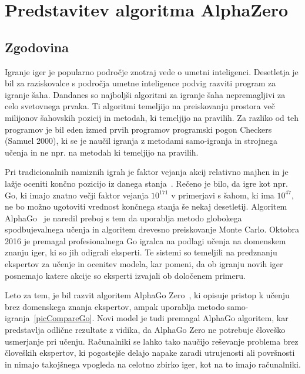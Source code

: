 \documentclass[a4paper, 12pt]{book}
\begin{document}

\chapter{Predstavitev algoritma AlphaZero}
\label{alphazero}
\section{Zgodovina}

Igranje iger je popularno področje znotraj vede o umetni inteligenci. 
Desetletja je bil za raziskovalce s področja umetne inteligence podvig razviti program za igranje šaha.
Dandanes so najboljši algoritmi za igranje šaha nepremagljivi za celo svetovnega prvaka.
Ti algoritmi temeljijo na preiskovanju prostora več milijonov šahovskih pozicij in metodah, ki temeljijo na pravilih.
Za razliko od teh programov je bil eden izmed prvih programov programski pogon Checkers (Samuel 2000), ki se je naučil igranja z metodami samo-igranja in strojnega učenja in ne npr. na metodah ki temeljijo na pravilih.

Pri tradicionalnih namiznih igrah je faktor vejanja akcij relativno majhen in je lažje oceniti končno pozicijo iz danega stanja~\cite{wiki:AlphaGo}.
Rečeno je bilo, da igre kot npr. Go, ki imajo znatno večji faktor vejanja $10^{171}$ v primerjavi s šahom, ki ima $10^{47}$, ne bo možno ugotoviti vrednost končnega stanja še nekaj desetletij.
Algoritem AlphaGo~\cite{silver2016mastering} je naredil preboj s tem da uporablja metodo globokega spodbujevalnega učenja in algoritem drevesno preiskovanje Monte Carlo. 
Oktobra 2016 je premagal profesionalnega Go igralca na podlagi učenja na domenskem znanju iger, ki so jih odigrali eksperti.
Te sistemi so temeljili na predznanju ekspertov za učenje in ocenitev modela, kar pomeni, da ob igranju novih iger posnemajo katere akcije so eksperti izvajali ob določenem primeru.

Leto za tem, je bil razvit algoritem AlphaGo Zero~\cite{silver2017mastering}, ki opisuje pristop k učenju brez domenskega znanja ekspertov, ampak uporablja metodo samo-igranja~\ref{picCompareGo}. 
Novi model je tudi premagal AlphaGo algoritem, kar predstavlja odlične rezultate z vidika, da AlphaGo Zero ne potrebuje človeško usmerjanje pri učenju.
Računalniki se lahko tako naučijo reševanje problema brez človeških ekspertov, ki pogostejše delajo napake zaradi utrujenosti ali površnosti in nimajo takojšnega vpogleda na celotno zbirko iger, kot na to imajo računalniki.
\end{document}
